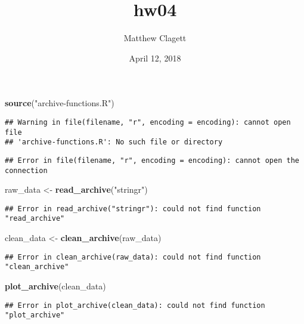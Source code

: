 \documentclass[]{article}
\title{hw04}
\author{Matthew Clagett}
\date{April 12, 2018}
\newenvironment{Shaded}{\begin{snugshade}}{\end{snugshade}}
\newcommand{\KeywordTok}[1]{\textcolor[rgb]{0.13,0.29,0.53}{\textbf{#1}}}
\newcommand{\StringTok}[1]{\textcolor[rgb]{0.31,0.60,0.02}{#1}}
\newcommand{\NormalTok}[1]{#1}
\begin{document}
\maketitle

\begin{Shaded}
\begin{Highlighting}[]
\KeywordTok{source}\NormalTok{(}\StringTok{"archive-functions.R"}\NormalTok{)}
\end{Highlighting}
\end{Shaded}

\begin{verbatim}
## Warning in file(filename, "r", encoding = encoding): cannot open file
## 'archive-functions.R': No such file or directory
\end{verbatim}

\begin{verbatim}
## Error in file(filename, "r", encoding = encoding): cannot open the connection
\end{verbatim}

\begin{Shaded}
\begin{Highlighting}[]
\NormalTok{raw_data <-}\StringTok{ }\KeywordTok{read_archive}\NormalTok{(}\StringTok{"stringr"}\NormalTok{)}
\end{Highlighting}
\end{Shaded}

\begin{verbatim}
## Error in read_archive("stringr"): could not find function "read_archive"
\end{verbatim}

\begin{Shaded}
\begin{Highlighting}[]
\NormalTok{clean_data <-}\StringTok{ }\KeywordTok{clean_archive}\NormalTok{(raw_data)}
\end{Highlighting}
\end{Shaded}

\begin{verbatim}
## Error in clean_archive(raw_data): could not find function "clean_archive"
\end{verbatim}

\begin{Shaded}
\begin{Highlighting}[]
\KeywordTok{plot_archive}\NormalTok{(clean_data)}
\end{Highlighting}
\end{Shaded}

\begin{verbatim}
## Error in plot_archive(clean_data): could not find function "plot_archive"
\end{verbatim}
\end{document}
